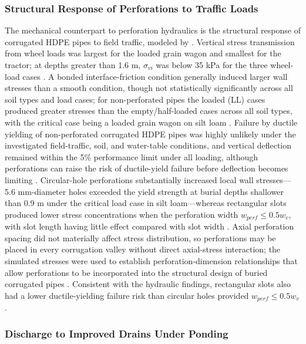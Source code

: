 \documentclass[11pt]{article}
\begin{document}
\subsubsection{Structural Response of Perforations to Traffic Loads}

The mechanical counterpart to perforation hydraulics is the structural response of
corrugated HDPE pipes to field traffic, modeled by \textcite{Gaj2021}. Vertical stress
transmission from wheel loads was largest for the loaded grain wagon and smallest for the
tractor; at depths greater than 1.6 m, $\sigma_{vi}$ was below 35 kPa for the three
wheel-load cases \parencite{Gaj2021}. A bonded interface-friction condition generally
induced larger wall stresses than a smooth condition, though not statistically
significantly across all soil types and load cases; for non-perforated pipes the loaded
(LL) cases produced greater stresses than the empty/half-loaded cases across all soil
types, with the critical case being a loaded grain wagon on silt loam \parencite{Gaj2021}.
Failure by ductile yielding of non-perforated corrugated HDPE pipes was highly unlikely
under the investigated field-traffic, soil, and water-table conditions, and vertical
deflection remained within the 5\% performance limit under all loading, although
perforations can raise the risk of ductile-yield failure before deflection becomes
limiting \parencite{Gaj2021}. Circular-hole perforations substantially increased local
wall stresses---5.6 mm-diameter holes exceeded the yield strength at burial depths
shallower than 0.9 m under the critical load case in silt loam---whereas rectangular slots
produced lower stress concentrations when the perforation width $w_{perf} \le 0.5 w_v$,
with slot length having little effect compared with slot width \parencite{Gaj2021}. Axial
perforation spacing did not materially affect stress distribution, so perforations may be
placed in every corrugation valley without direct axial-stress interaction; the simulated
stresses were used to establish perforation-dimension relationships that allow perforations
to be incorporated into the structural design of buried corrugated pipes
\parencite{Gaj2021}. Consistent with the hydraulic findings, rectangular slots also had a
lower ductile-yielding failure risk than circular holes provided $w_{perf} \le 0.5 w_v$
\parencite{Gaj2021}.

\subsubsection{Discharge to Improved Drains Under Ponding}
\end{document}
